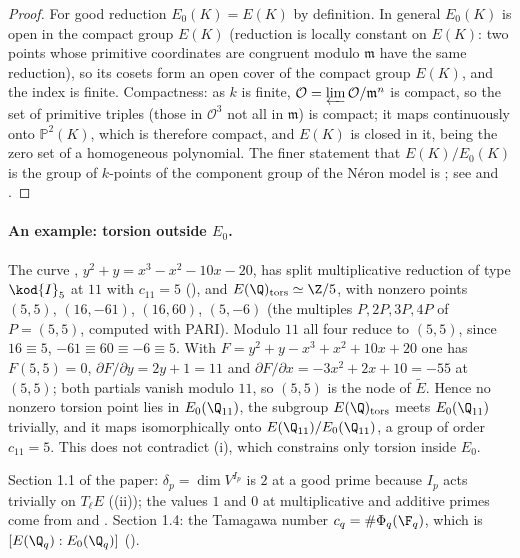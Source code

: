 \begin{proof}
For good reduction $E_0(K)=E(K)$ by definition. In general $E_0(K)$ is open in the compact group $E(K)$ (reduction is locally constant on $E(K)$: two points whose primitive
coordinates are congruent modulo $\mathfrak m$ have the same reduction), so its cosets form an open cover of the compact group $E(K)$, and the
index is finite. Compactness: as $k$ is finite, $\mathcal O=\varprojlim\mathcal O/\mathfrak m^n$ is compact, so the set of primitive triples
(those in $\mathcal O^3$ not all in $\mathfrak m$) is compact; it maps continuously onto $\mathbb P^2(K)$, which is therefore compact, and
$E(K)$ is closed in it, being the zero set of a homogeneous polynomial. The finer
statement that $E(K)/E_0(K)$ is the group of $k$-points of the component group of the N\'eron model is
; see \cite[VII.6]{SilvermanAEC} and \cite[IV.9]{SilvermanATAEC}.
\end{proof}

\paragraph{An example: torsion outside $E_0$.} The curve , $y^2+y=x^3-x^2-10x-20$, has split multiplicative
reduction of type $\kod{I}_5$ at $11$ with $c_{11}=5$ (), and $E(\Q)_{\mathrm{tors}}\simeq\Z/5$, with
nonzero points $(5,5)$, $(16,-61)$, $(16,60)$, $(5,-6)$ (the multiples $P,2P,3P,4P$ of $P=(5,5)$, computed with PARI). Modulo $11$
all four reduce to $(5,5)$, since $16\equiv5$, $-61\equiv60\equiv-6\equiv5$. With $F=y^2+y-x^3+x^2+10x+20$ one has $F(5,5)=0$,
$\partial F/\partial y=2y+1=11$ and $\partial F/\partial x=-3x^2+2x+10=-55$ at $(5,5)$; both partials vanish modulo $11$, so $(5,5)$ is
the node of $\tilde E$. Hence no nonzero torsion point lies in $E_0(\Q_{11})$, the subgroup $E(\Q)_{\mathrm{tors}}$ meets $E_0(\Q_{11})$
trivially, and it maps isomorphically onto $E(\Q_{11})/E_0(\Q_{11})$, a group of order $c_{11}=5$. This does not contradict
(i), which constrains only torsion inside $E_0$.

\begin{paperlink}
Section 1.1 of the paper: $\delta_p=\dim V^{I_p}$ is $2$ at a good prime because $I_p$ acts trivially on $T_\ell E$
((ii)); the values $1$ and $0$ at multiplicative and additive primes come
from  and . Section 1.4: the Tamagawa
number $c_q=\#\Phi_q(\F_q)$, which is $[E(\Q_q):E_0(\Q_q)]$ ().
\end{paperlink}


